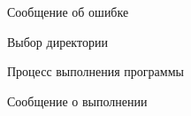 \begin{figure}[h!]
\caption{ Сообщение об ошибке }
\label{ship_2:ship_2}
\end{figure}

\begin{figure}[h!]
\caption{ Выбор директории }
\label{ship_3:ship_3}
\end{figure}

\begin{figure}[h!]
\caption{ Процесс выполнения программы }
\label{ship_4:ship_4}
\end{figure}

\begin{figure}[h!]
\caption{ Сообщение о выполнении }
\label{ship_5:ship_5}
\end{figure}

\clearpage




